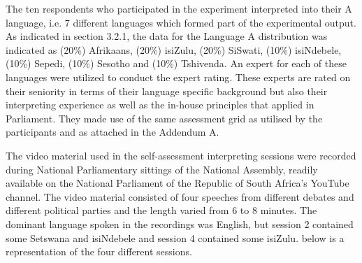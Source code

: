 \documentclass[output=paper]{langsci/langscibook}
\begin{document}
The ten respondents who participated in the experiment interpreted into their A language, i.e. 7 different languages which formed part of the experimental output. As indicated in section 3.2.1, the data for the Language A distribution was indicated as (20\%) Afrikaans, (20\%) isiZulu, (20\%) SiSwati, (10\%) isiNdebele, (10\%) Sepedi, (10\%) Sesotho and (10\%) Tshivenda. An expert for each of these languages were utilized to conduct the expert rating. These experts are rated on their seniority in terms of their language specific background but also their interpreting experience as well as the in-house principles that applied in Parliament. They made use of the same assessment grid as utilised by the participants and as attached in the Addendum A.

The video material used in the self-assessment interpreting sessions were re\-corded during National Parliamentary sittings of the National Assembly, readily available on the National Parliament of the Republic of South Africa’s YouTube channel. The video material consisted of four speeches from different debates and different political parties and the length varied from 6 to 8 minutes. The dominant language spoken in the recordings was English, but session 2 contained some Setswana and isiNdebele and session 4 contained some isiZulu.  below is a representation of the four different sessions.

\begin{table}
\caption{\label{tab:deysel:3a}Summary of the different interpreting sessions}
\end{table}
\end{document}

